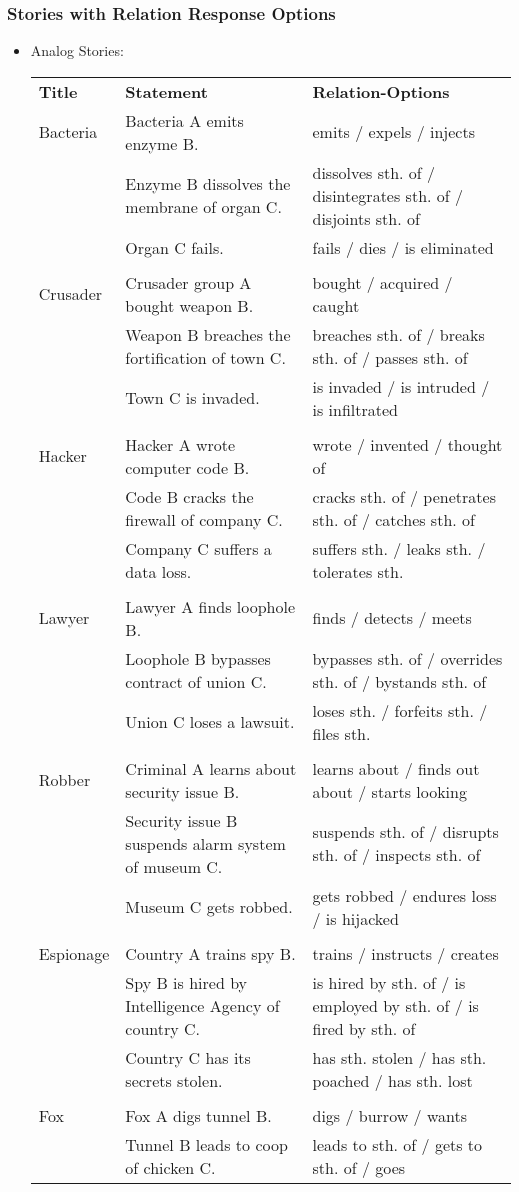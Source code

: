\subsubsection{Stories with Relation Response Options}
\begin{itemize}
\item Analog Stories:
\scriptsize
\begin{longtable}{p{}p{}p{}}
\textbf{Title} & \textbf{Statement} &\textbf{Relation-Options}\\
Bacteria & Bacteria A emits enzyme B. & emits / expels / injects \\   & Enzyme B dissolves the membrane of organ C. & dissolves sth. of / disintegrates sth. of / disjoints sth. of \\   & Organ C fails. & fails / dies / is eliminated \\  & & \\ Crusader & Crusader group A bought weapon B. & bought / acquired / caught \\   & Weapon B breaches the fortification of town C. & breaches sth. of / breaks sth. of / passes sth. of \\   & Town C is invaded. & is invaded / is intruded / is infiltrated \\  & & \\ Hacker & Hacker A wrote computer code B. & wrote / invented / thought of \\   & Code B cracks the firewall of company C. & cracks sth. of / penetrates sth. of / catches sth. of \\   & Company C suffers a data loss. & suffers sth. / leaks sth. / tolerates sth. \\  & & \\ Lawyer & Lawyer A finds loophole B. & finds / detects / meets \\   & Loophole B bypasses contract of union C. & bypasses sth. of / overrides sth. of / bystands sth. of \\   & Union C loses a lawsuit. & loses sth. / forfeits sth. / files sth. \\  & & \\ Robber & Criminal A learns about security issue B. & learns about / finds out about / starts looking \\   & Security issue B suspends alarm system of museum C. & suspends sth. of / disrupts sth. of / inspects sth. of \\   & Museum C gets robbed. & gets robbed / endures loss / is hijacked \\  & & \\ Espionage & Country A trains spy B. & trains / instructs / creates \\   & Spy B is hired by Intelligence Agency of country C. & is hired by sth. of / is employed by sth. of / is fired by sth. of \\   & Country C has its secrets stolen. & has sth. stolen / has sth. poached / has sth. lost \\  & & \\ Fox & Fox A digs tunnel B. & digs / burrow / wants \\   & Tunnel B leads to coop of chicken C. & leads to sth. of / gets to sth. of / goes 
\end{longtable}
\end{itemize}
